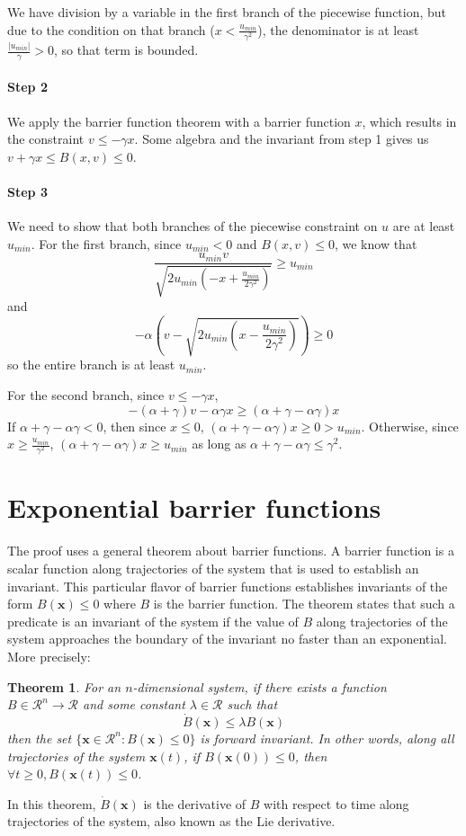 \documentclass[12pt]{article}
\newtheorem{theorem}{Theorem}
\newcommand{\vecbold}[1]{\boldsymbol{#1}}
\newcommand{\umin}{u_{min}}
\newcommand{\p}{\gamma}
\newcommand{\q}{\alpha}
\begin{document}
We have division by a variable in the first branch of the piecewise function, but due to
the condition on that branch ($x < \frac{\umin}{\p^2}$), the denominator is
at least $\frac{|\umin|}{\p} > 0$, so that term is bounded.

\paragraph*{Step 2}
We apply the barrier function theorem with a barrier function $x$, which
results in the constraint $v \leq -\p x$. Some algebra and the invariant
from step 1 gives us $v + \p x \leq B(x,v) \leq 0$.

\paragraph*{Step 3}
We need to show that both branches of the piecewise constraint on $u$ are
at least $\umin$. For the first branch, since $\umin < 0$ and $B(x,v) \leq 0$, we know that
\[\frac{\umin v}{\sqrt{2\umin(-x + \frac{\umin}{2\p^2})}} \geq \umin\]
and
\[-\q\left(v - \sqrt{2\umin(x - \frac{\umin}{2\p^2})}\right) \geq 0\]
so the entire branch is at least $\umin$.

For the second branch, since $v \leq -\p x$,
\[-(\q + \p) v -\q\p x \geq (\q + \p - \q\p)x\]
If $\q+\p-\q\p < 0$, then since $x \leq 0$, $(\q+\p -\q\p)x \geq 0 >
\umin$. Otherwise, since $x \geq \frac{\umin}{\p^2}$, $(\q+\p -\q\p)x \geq
\umin$ as long as $\q + \p -\q\p \leq \p^2$.

\section{Exponential barrier functions}
The proof uses a general theorem about barrier functions. A barrier
function is a scalar function along trajectories of the system that is used
to establish an invariant. This particular flavor of barrier functions
establishes invariants of the form $B(\vecbold{x}) \leq 0$ where $B$ is the
barrier function. The theorem states that such a predicate is an invariant
of the system if the value of $B$ along trajectories of the system
approaches the boundary of the invariant no faster than an
exponential. More precisely:

\begin{theorem}
For an $n$-dimensional system, if there exists a function $B \in \mathcal{R}^n \rightarrow \mathcal{R}$ and some constant $\lambda \in \mathcal{R}$ such that
\[\dot{B}(\vecbold{x}) \leq \lambda B(\vecbold{x})\]
then the set $\{\vecbold{x} \in \mathcal{R}^n : B(\vecbold{x}) \leq 0\}$ is forward invariant. In other words, along all trajectories of the system $\vecbold{x}(t)$, if $B(\vecbold{x}(0)) \leq 0$, then $\forall t \geq 0, B(\vecbold{x}(t)) \leq 0$.
\label{thm:exp-barrier}
\end{theorem}

In this theorem, $\dot{B}(\vecbold{x})$ is the derivative of $B$ with
respect to time along trajectories of the system, also known as the Lie
derivative.
\end{document}
